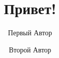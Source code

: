 \documentclass[a4paper]{article}
\begin{document}
\title{Привет!}
\author{Первый Автор}
\author{Второй Автор}
\maketitle
\end{document}
